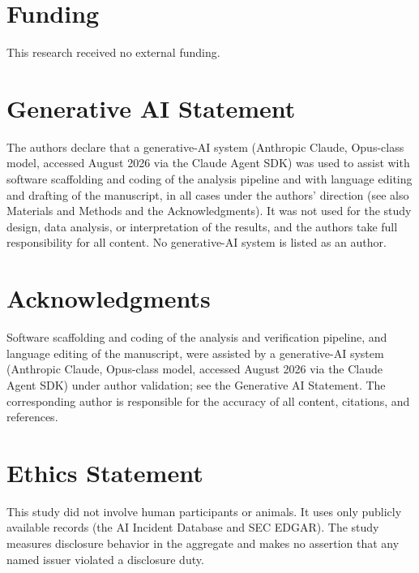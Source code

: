 \documentclass[utf8]{FrontiersinHarvard}
\begin{document}
\section*{Funding}
This research received no external funding.

\section*{Generative AI Statement}
The authors declare that a generative-AI system (Anthropic Claude, Opus-class model, accessed August 2026 via the Claude Agent SDK) was used to assist with software scaffolding and coding of the analysis pipeline and with language editing and drafting of the manuscript, in all cases under the authors' direction (see also Materials and Methods and the Acknowledgments). It was not used for the study design, data analysis, or interpretation of the results, and the authors take full responsibility for all content. No generative-AI system is listed as an author.

\section*{Acknowledgments}
Software scaffolding and coding of the analysis and verification pipeline, and language editing of the manuscript, were assisted by a generative-AI system (Anthropic Claude, Opus-class model, accessed August 2026 via the Claude Agent SDK) under author validation; see the Generative AI Statement. The corresponding author is responsible for the accuracy of all content, citations, and references.

\section*{Ethics Statement}
This study did not involve human participants or animals. It uses only publicly available records (the AI Incident Database and SEC EDGAR). The study measures disclosure behavior in the aggregate and makes no assertion that any named issuer violated a disclosure duty.
\end{document}

